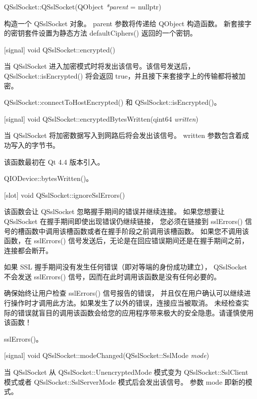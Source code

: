QSslSocket::QSslSocket(QObject \emph{*parent} = nullptr)

构造一个 QSslSocket 对象。
parent 参数将传递给 QObject 构造函数。
新套接字的密钥套件设置为静态方法 defaultCiphers() 返回的一个密钥。

[signal] void QSslSocket::encrypted()

当 QSslSocket 进入加密模式时将发出该信号。该信号发送后， 
QSslSocket::isEncrypted() 将会返回 true，并且接下来套接字上的传输都将被加密。

\begin{seeAlso}
QSslSocket::connectToHostEncrypted() 和 QSslSocket::isEncrypted()。
\end{seeAlso}


[signal] void QSslSocket::encryptedBytesWritten(qint64 \emph{written})

当 QSslSocket 将加密数据写入到网路后将会发出该信号。
 written 参数包含着成功写入的字节书。

该函数最初在 Qt 4.4 版本引入。

\begin{seeAlso}
QIODevice::bytesWritten()。
\end{seeAlso}

[slot] void QSslSocket::ignoreSslErrors()

该函数会让 QSslSocket 忽略握手期间的错误并继续连接。
如果您想要让 QSslSocket 在握手期间即使出现错误仍继续链接，
您必须在链接到 sslErrors() 信号的槽函数中调用该槽函数或者在握手阶段之前调用该槽函数。
如果您不调用该函数，在 sslErrors() 信号发送后，无论是在回应错误期间还是在握手期间之前，
连接都会断开。

如果 SSL 握手期间没有发生任何错误（即对等端的身份成功建立），
QSslSocket 不会发送 sslErrors() 信号，因而在此时调用该函数是没有任何必要的。

\begin{warning}
确保始终让用户检查 sslErrors() 信号报告的错误，
并且仅在用户确认可以继续进行操作时才调用此方法。如果发生了以外的错误，连接应当被取消。
未经检查实际的错误就盲目的调用该函数会给您的应用程序带来极大的安全隐患。请谨慎使用该函数！
\end{warning}

\begin{seeAlso}
sslErrors()。
\end{seeAlso}

[signal] void QSslSocket::modeChanged(QSslSocket::SslMode \emph{mode})

当 QSslSocket 从 QSslSocket::UnencryptedMode 
模式变为 QSslSocket::SslClient 模式或者 
QSslSocket::SslServerMode 模式后会发出该信号。 参数 mode 即新的模式。

